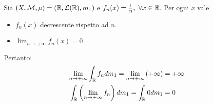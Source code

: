 \begin{examplewt}
	Sia $\left(X,\mathcal{M},\mu\right)=\left(\mathbb{R},\mathcal{L}(\mathbb{R}),m_1\right)$ e $f_n(x)=\frac{1}{n},\ \forall x\in\mathbb{R}$. Per ogni $x$ vale
	\begin{itemize}
		\item $f_n(x)$ decrescente rispetto ad $n$.
		\item $\displaystyle\lim_{n\to+\infty}f_n(x)=0$
	\end{itemize}
Pertanto:
\begin{align*}
	\lim_{n\to+\infty}\int_{\mathbb{R}}f_ndm_1=\lim_{n\to+\infty}\left(+\infty\right)&=+\infty\\
	\int_{\mathbb{R}}\left(\lim_{n\to+\infty}f_n\right)dm_1=\int_{\mathbb{R}}0dm_1&=0
\end{align*}
\end{examplewt}
